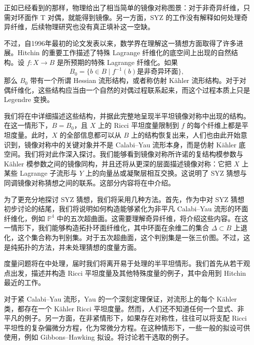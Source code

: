 正如已经看到的那样，物理给出了相当简单的镜像对称图景：对于非奇异纤维，只需对环面作 T 对偶，就能得到镜像。另一方面，SYZ 的工作没有解释如何处理奇异纤维，后续物理研究也没有真正填补这一空缺。

不过，自1996年最初的论文发表以来，数学界在理解这一猜想方面取得了许多进展。Hitchin 的重要工作描述了特殊 Lagrange 纤维化的底空间上出现的自然结构。设 $f\colon X\to B$ 是所预期的特殊 Lagrange 纤维化。如果
\[
B_0=\{b\in B\mid f^{-1}(b)\text{是非奇异环面}\},
\]
那么 $B_0$ 带有一个所谓 Hessian 流形结构，或者称仿射 Kähler 流形结构。对于对偶纤维化，这些结构应当由一个自然的对偶过程联系起来，而这个过程本质上只是 Legendre 变换。

我们将在中详细描述这些结构，并据此完整地呈现半平坦镜像对称中出现的结构。在这一情形下，$B=B_0$，且 $X$ 上的 Ricci 平坦度量限制到 $f$ 的每个纤维上都是平坦度量。此时，$X$ 的全部信息都可以从 $B$ 上的结构恢复出来，人们也由此开始意识到，镜像对称中的关键对象并不是 Calabi--Yau 流形本身，而是仿射 Kähler 底空间。我们将对此作深入探讨。我们能够看到镜像对称所许诺的复结构模参数与 Kähler 模参数之间的镜像同构，并且还将从更深的层面描述镜像对称：它把 $X$ 上某些 Lagrange 子流形与 $Y$ 上的向量丛或凝聚层相互交换。这说明了 SYZ 猜想与同调镜像对称猜想之间的联系。这部分内容将在中介绍。

为了更充分地探讨 SYZ 猜想，我们将采用几种方法。首先，作为中对 SYZ 猜想初步讨论的结尾，我们将说明如何构造能够紧化为非平凡 Calabi--Yau 流形的环面纤维化，例如 $\mathbb{P}^4$ 中的五次超曲面。这需要理解奇异纤维，将介绍这些内容。在这一情形下，我们能够构造拓扑环面纤维化，其中环面在余维二的集合 $\Delta\subset B$ 上退化，这个集合称为判别集。对于五次超曲面，这个判别集是一张三价图。不过，这是纯拓扑的方法，并未处理猜想的度量方面。

度量问题将在中处理，届时我们将离开易于处理的半平坦情形。我们首先从若干观点出发，描述并构造 Ricci 平坦度量及其他特殊度量的例子，其中会用到 Hitchin 最近的工作。

对于紧 Calabi--Yau 流形，Yau 的一个深刻定理保证，对流形上的每个 Kähler 类，都存在一个 Kähler Ricci 平坦度量。然而，人们还不知道任何一个显式、非平凡的例子。另一方面，在非紧情形下，如果存在对称性，往往可以将支配 Ricci 平坦性的复杂偏微分方程，化为常微分方程。在这种情形下，一些一般的拟设可供使用，例如 Gibbons--Hawking 拟设。将讨论若干选取的例子。

